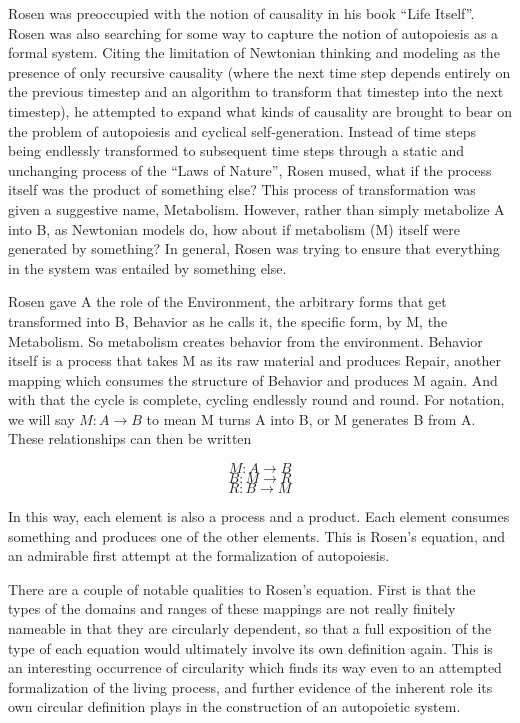 \documentclass[12pt]{scrartcl}
\begin{document}
Rosen was preoccupied with the notion of causality in his book ``Life Itself''.  \cite{Rosen}  Rosen was also searching for some way to capture the notion of autopoiesis as a formal system.  Citing the limitation of Newtonian thinking and modeling as the presence of only recursive causality (where the next time step depends entirely on the previous timestep and an algorithm to transform that timestep into the next timestep), he attempted to expand what kinds of causality are brought to bear on the problem of autopoiesis and cyclical self-generation.  Instead of time steps being endlessly transformed to subsequent time steps through a static and unchanging process of the ``Laws of Nature'', Rosen mused, what if the process itself was the product of something else?  This process of transformation was given a suggestive name, Metabolism.  However, rather than simply metabolize A into B, as Newtonian models do, how about if metabolism (M) itself were generated by something?  In general, Rosen was trying to ensure that everything in the system was entailed by something else.  

Rosen gave A the role of the Environment, the arbitrary forms that get transformed into B, Behavior as he calls it, the specific form, by M, the Metabolism.  So metabolism creates behavior from the environment.  Behavior itself is a process that takes M as its raw material and produces Repair, another mapping which consumes the structure of Behavior and produces M again.  And with that the cycle is complete, cycling endlessly round and round.  For notation, we will say $M:A \rightarrow B$ to mean M turns A into B, or M generates B from A.  These relationships can then be written

$$ M:A \rightarrow B $$
$$ B:M \rightarrow R $$
$$ R:B \rightarrow M $$

In this way, each element is also a process and a product.  Each element consumes something and produces one of the other elements.  This is Rosen's equation, and an admirable first attempt at the formalization of autopoiesis.  

There are a couple of notable qualities to Rosen's equation.  First is that the types of the domains and ranges of these mappings are not really finitely nameable in that they are circularly dependent, so that a full exposition of the type of each equation would ultimately involve its own definition again.  This is an interesting occurrence of circularity which finds its way even to an attempted formalization of the living process, and further evidence of the inherent role its own circular definition plays in the construction of an autopoietic system.  
\end{document}

